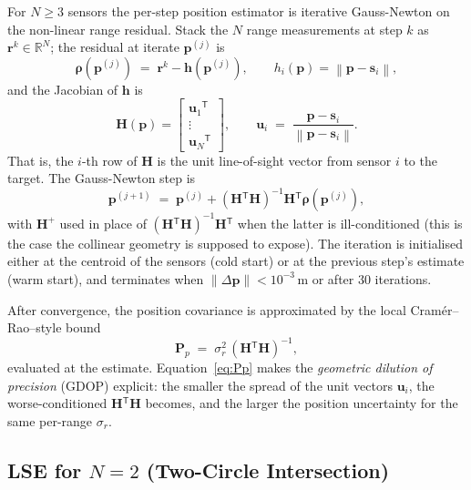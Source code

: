 \documentclass[11pt,a4paper]{article}
\newcommand{\R}{\mathbb{R}}
\newcommand{\norm}[1]{\left\lVert #1 \right\rVert}
\newcommand{\transpose}{{}^{\mathsf{T}}}
\begin{document}
For $N \ge 3$ sensors the per-step position estimator is iterative
Gauss-Newton on the non-linear range residual.  Stack the $N$ range
measurements at step $k$ as $\mathbf{r}^k \in \R^N$; the residual at iterate
$\mathbf{p}^{(j)}$ is
\begin{equation}
  \boldsymbol{\rho}(\mathbf{p}^{(j)})
  \;=\; \mathbf{r}^k - \mathbf{h}(\mathbf{p}^{(j)}),
  \qquad
  h_i(\mathbf{p}) = \norm{\mathbf{p} - \mathbf{s}_i},
\end{equation}
and the Jacobian of $\mathbf{h}$ is
\begin{equation}
  \mathbf{H}(\mathbf{p}) = \begin{bmatrix} \mathbf{u}_1\transpose \\ \vdots \\ \mathbf{u}_N\transpose \end{bmatrix},
  \qquad
  \mathbf{u}_i \;=\; \frac{\mathbf{p} - \mathbf{s}_i}{\norm{\mathbf{p} - \mathbf{s}_i}}.
  \label{eq:H-rows}
\end{equation}
That is, the $i$-th row of $\mathbf{H}$ is the unit line-of-sight vector
from sensor $i$ to the target.  The Gauss-Newton step is
\begin{equation}
  \mathbf{p}^{(j+1)}
  \;=\; \mathbf{p}^{(j)} + (\mathbf{H}\transpose \mathbf{H})^{-1}
        \mathbf{H}\transpose
        \boldsymbol{\rho}(\mathbf{p}^{(j)}),
\end{equation}
with $\mathbf{H}^+$ used in place of $(\mathbf{H}\transpose
\mathbf{H})^{-1}\mathbf{H}\transpose$ when the latter is ill-conditioned
(this is the case the collinear geometry is supposed to expose).  The
iteration is initialised either at the centroid of the sensors (cold start)
or at the previous step's estimate (warm start), and terminates when
$\norm{\Delta\mathbf{p}} < 10^{-3}\,\mathrm{m}$ or after 30 iterations.

After convergence, the position covariance is approximated by the local
Cram\'er--Rao--style bound
\begin{equation}
  \mathbf{P}_p \;=\; \sigma_r^2 \,(\mathbf{H}\transpose \mathbf{H})^{-1},
  \label{eq:Pp}
\end{equation}
evaluated at the estimate.  Equation~\eqref{eq:Pp} makes the
\emph{geometric dilution of precision} (GDOP) explicit: the smaller the
spread of the unit vectors $\mathbf{u}_i$, the worse-conditioned
$\mathbf{H}\transpose \mathbf{H}$ becomes, and the larger the position
uncertainty for the same per-range $\sigma_r$.

\subsection{LSE for $N = 2$ (Two-Circle Intersection)}
\end{document}
